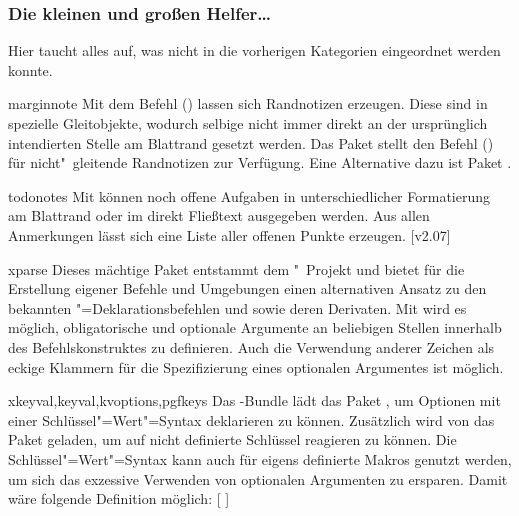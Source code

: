 \subsubsection{Die kleinen und großen Helfer\dots}
Hier taucht alles auf, was nicht in die vorherigen Kategorien eingeordnet 
werden konnte.
%
\begin{packages}
\item[marginnote]
  Mit dem Befehl () lassen sich 
  Randnotizen erzeugen. Diese sind in  spezielle Gleitobjekte, 
  wodurch selbige nicht immer direkt an der ursprünglich intendierten Stelle am 
  Blattrand gesetzt werden. Das Paket  stellt den Befehl 
  () für nicht"~gleitende Randnotizen zur 
  Verfügung. Eine Alternative dazu ist Paket .
\item[todonotes]
  Mit  können noch offene Aufgaben in unterschiedlicher 
  Formatierung am Blattrand oder im direkt Fließtext ausgegeben werden. Aus 
  allen Anmerkungen lässt sich eine Liste aller offenen Punkte erzeugen.
  [v2.07]
\item[xparse]
  Dieses mächtige Paket entstammt dem "~Projekt und bietet für 
  die Erstellung eigener Befehle und Umgebungen einen alternativen Ansatz zu 
  den bekannten "=Deklarationsbefehlen  und 
   sowie deren Derivaten. Mit  wird es 
  möglich, obligatorische und optionale Argumente an beliebigen Stellen 
  innerhalb des Befehlskonstruktes zu definieren. Auch die Verwendung anderer 
  Zeichen als eckige Klammern für die Spezifizierung eines optionalen 
  Argumentes ist möglich.
\item[xkeyval,keyval,kvoptions,pgfkeys]
  Das \KOMAScript-Bundle lädt das Paket , um Optionen mit 
  einer Schlüssel"=Wert"=Syntax deklarieren zu können. Zusätzlich wird von 
  \TUDScript das Paket  geladen, um auf nicht definierte 
  Schlüssel reagieren zu können. Die Schlüssel"=Wert"=Syntax kann auch für 
  eigens definierte Makros genutzt werden, um sich das exzessive Verwenden von 
  optionalen Argumenten zu ersparen. Damit wäre folgende Definition möglich:
  [%
  ]%
  

\end{packages}
